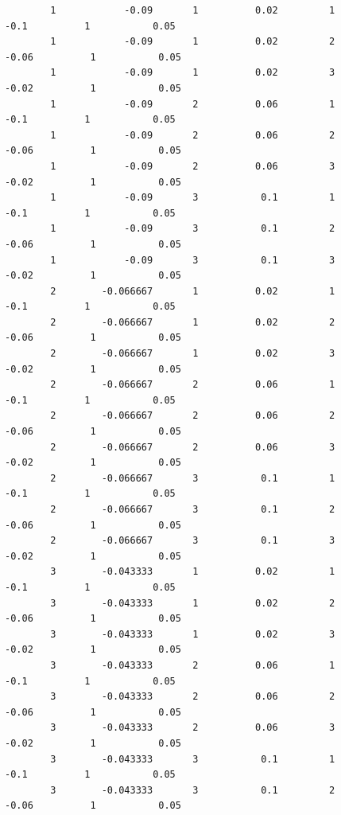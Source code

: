 \documentclass[
]{book}
\begin{document}
\begin{verbatim}
        1            -0.09       1          0.02         1           -0.1          1           0.05   
        1            -0.09       1          0.02         2          -0.06          1           0.05   
        1            -0.09       1          0.02         3          -0.02          1           0.05   
        1            -0.09       2          0.06         1           -0.1          1           0.05   
        1            -0.09       2          0.06         2          -0.06          1           0.05   
        1            -0.09       2          0.06         3          -0.02          1           0.05   
        1            -0.09       3           0.1         1           -0.1          1           0.05   
        1            -0.09       3           0.1         2          -0.06          1           0.05   
        1            -0.09       3           0.1         3          -0.02          1           0.05   
        2        -0.066667       1          0.02         1           -0.1          1           0.05   
        2        -0.066667       1          0.02         2          -0.06          1           0.05   
        2        -0.066667       1          0.02         3          -0.02          1           0.05   
        2        -0.066667       2          0.06         1           -0.1          1           0.05   
        2        -0.066667       2          0.06         2          -0.06          1           0.05   
        2        -0.066667       2          0.06         3          -0.02          1           0.05   
        2        -0.066667       3           0.1         1           -0.1          1           0.05   
        2        -0.066667       3           0.1         2          -0.06          1           0.05   
        2        -0.066667       3           0.1         3          -0.02          1           0.05   
        3        -0.043333       1          0.02         1           -0.1          1           0.05   
        3        -0.043333       1          0.02         2          -0.06          1           0.05   
        3        -0.043333       1          0.02         3          -0.02          1           0.05   
        3        -0.043333       2          0.06         1           -0.1          1           0.05   
        3        -0.043333       2          0.06         2          -0.06          1           0.05   
        3        -0.043333       2          0.06         3          -0.02          1           0.05   
        3        -0.043333       3           0.1         1           -0.1          1           0.05   
        3        -0.043333       3           0.1         2          -0.06          1           0.05   

\end{verbatim}
\end{document}
